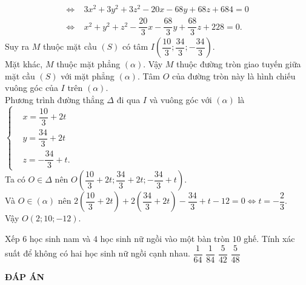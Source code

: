 \documentclass[12pt,a4paper,oneside]{book}
\newcommand{\heva}[1]{
	\left\{\begin{aligned}#1\end{aligned}\right.}
\begin{document}
\begin{ex}
{\begin{align*}
\Leftrightarrow&\; 3x^2+3y^2+3z^2-20x-68y+68z+684=0\\
\Leftrightarrow&\; x^2+y^2+z^2-\dfrac{20}{3}x-\dfrac{68}{3}y+\dfrac{68}{3}z+228=0.
\end{align*}
Suy ra $ M $ thuộc mặt cầu $ (S) $ có tâm $ I\left(\dfrac{10}{3}; \dfrac{34}{3}; -\dfrac{34}{3}\right) $.\\
Mặt khác, $ M $ thuộc mặt phẳng $ (\alpha) $. Vậy $ M $ thuộc đường tròn giao tuyến giữa mặt cầu $ (S) $ với mặt phẳng $ (\alpha) $. Tâm $ O $ của đường tròn này là hình chiếu vuông góc của $ I $ trên $ (\alpha) $.\\
Phương trình đường thẳng $ \Delta $ đi qua $ I $ và vuông góc với $ (\alpha) $ là $ \heva{& x=\dfrac{10}{3}+2t\\ &y=\dfrac{34}{3}+2t\\& z=-\dfrac{34}{3}+t.} $\\
Ta có $ O\in\Delta $ nên $ O\left(\dfrac{10}{3}+2t; \dfrac{34}{3}+2t; -\dfrac{34}{3}+t\right) $.\\
Và $ O\in (\alpha) $ nên $ 2\left(\dfrac{10}{3}+2t\right)+2\left(\dfrac{34}{3}+2t\right)-\dfrac{34}{3}+t-12=0\Leftrightarrow t=-\dfrac{2}{3}$.\\
Vậy $ O\left(2; 10; -12\right) $.
}
\end{ex}

\begin{ex}%
Xếp $ 6 $ học sinh nam và $ 4 $ học sinh nữ ngồi vào một bàn tròn $ 10 $ ghế. Tính xác suất để không có hai học sinh nữ ngồi cạnh nhau. 
	\choice
	{$\dfrac{1}{64}$}
	{$\dfrac{1}{84}$}
	{\True $\dfrac{5}{42}$}
	{$\dfrac{5}{48}$}
\end{ex}












\newpage
\begin{center}
	\textbf{ĐÁP ÁN}
\end{center}
\begin{multicols}{10}
	 
\end{multicols}
\end{document}
